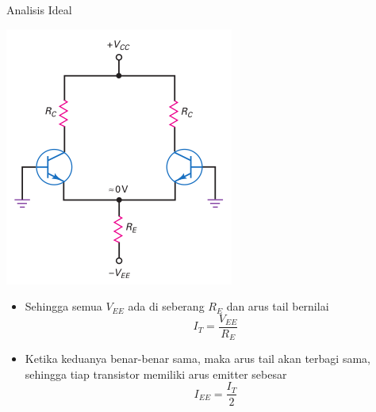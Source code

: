 \documentclass[aspectratio=169]{beamer}
\begin{document}
\begin{frame}{Analisis Ideal}
	\begin{multicols}{2}
		\begin{center}
			\includegraphics[width=0.7\textheight]{gambar/01.ideal_dc_analysis}
		\end{center}
		\columnbreak
		\begin{itemize}
			\item Sehingga semua $ V_{EE} $ ada di seberang $ R_E $ dan arus tail bernilai
			\begin{equation} \label{pers.5}
				I_T = \frac{V_{EE}}{R_E}
			\end{equation}
			\item Ketika keduanya benar-benar sama, maka arus tail akan terbagi sama, sehingga tiap transistor memiliki arus emitter sebesar \\
			\begin{equation} \label{pers.6}
				I_{EE} = \frac{I_T}{2}
			\end{equation}
		\end{itemize}
		\vfill\null
	\end{multicols}
\end{frame}
\end{document}
